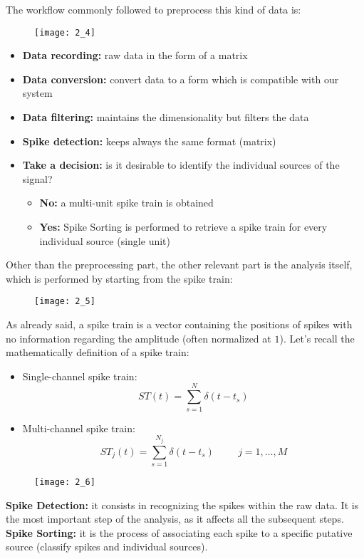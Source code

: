 The workflow commonly followed to preprocess this kind of data is:
\begin{figure}[H]
    \texttt{[image: 2\_4]}
    \centering
\end{figure}
\begin{itemize}
    \item \textbf{Data recording:} raw data in the form of a matrix
    \item \textbf{Data conversion:} convert data to a form which is compatible with our system
    \item \textbf{Data filtering:} maintains the dimensionality but filters the data
    \item \textbf{Spike detection:} keeps always the same format (matrix)
    \item \textbf{Take a decision:} is it desirable to identify the individual sources of the signal?
          \begin{itemize}
              \item \textbf{No:} a multi-unit spike train is obtained
              \item \textbf{Yes:} Spike Sorting is performed to retrieve a spike train for
                    every individual source (single unit)
          \end{itemize}
\end{itemize}
Other than the preprocessing part, the other relevant part is the analysis itself, which is performed
by starting from the spike train:
\begin{figure}[H]
    \texttt{[image: 2\_5]}
    \centering
\end{figure}
As already said, a spike train is a vector containing the positions of spikes with no information
regarding the amplitude (often normalized at \(1\)).
Let's recall the mathematically definition of a spike train:
\begin{itemize}
    \item Single-channel spike train:
          \begin{equation*}
              ST(t)=\sum_{s=1}^{N}\delta{(t-t_s)}
          \end{equation*}
    \item Multi-channel spike train:
          \begin{equation*}
              ST_j(t)=\sum_{s=1}^{N_j}\delta(t-t_s) \hspace{1cm} j=1,\dots,M
          \end{equation*}
\end{itemize}
\begin{figure}[H]
    \texttt{[image: 2\_6]}
    \centering
\end{figure}
\textbf{Spike Detection:} it consists in recognizing the spikes within the raw data. It is the most
important step of the analysis, as it affects all the subsequent steps.\\
\textbf{Spike Sorting:} it is the process of associating each spike to a specific putative source
(classify spikes and individual sources).\\

